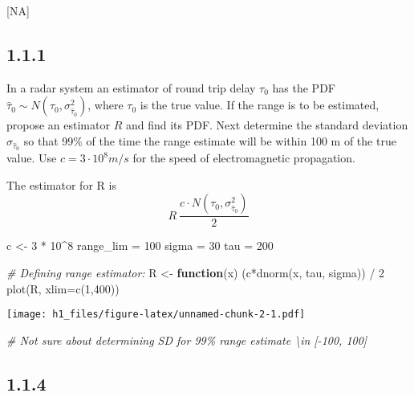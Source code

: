 \documentclass[
]{article}
\newenvironment{Shaded}{\begin{snugshade}}{\end{snugshade}}
\newcommand{\AttributeTok}[1]{\textcolor[rgb]{0.77,0.63,0.00}{#1}}
\newcommand{\CommentTok}[1]{\textcolor[rgb]{0.56,0.35,0.01}{\textit{#1}}}
\newcommand{\ControlFlowTok}[1]{\textcolor[rgb]{0.13,0.29,0.53}{\textbf{#1}}}
\newcommand{\DecValTok}[1]{\textcolor[rgb]{0.00,0.00,0.81}{#1}}
\newcommand{\FunctionTok}[1]{\textcolor[rgb]{0.00,0.00,0.00}{#1}}
\newcommand{\NormalTok}[1]{#1}
\newcommand{\OtherTok}[1]{\textcolor[rgb]{0.56,0.35,0.01}{#1}}
\newcommand{\SpecialCharTok}[1]{\textcolor[rgb]{0.00,0.00,0.00}{#1}}
\begin{document}
{[}NA{]}

\hypertarget{section-1}{%
\subsection{1.1.1}\label{section-1}}

In a radar system an estimator of round trip delay \(\tau_0\) has the
PDF \(\hat \tau_0 \sim N(\tau_0,\sigma_{\hat\tau_0}^2)\), where
\(\tau_0\) is the true value. If the range is to be estimated, propose
an estimator \(R\) and find its PDF. Next determine the standard
deviation \(\sigma_{\hat\tau_0}\) so that 99\% of the time the range
estimate will be within 100 m of the true value. Use
\(c=3\cdot 10^8 m/s\) for the speed of electromagnetic propagation.

The estimator for R is
\[R~\dfrac{c\cdot N(\tau_0, \sigma^2_{\hat \tau_0})}{2}\]

\begin{Shaded}
\begin{Highlighting}[]
\NormalTok{c }\OtherTok{\textless{}{-}} \DecValTok{3} \SpecialCharTok{*} \DecValTok{10}\SpecialCharTok{\^{}}\DecValTok{8}
\NormalTok{range\_lim }\OtherTok{=} \DecValTok{100}
\NormalTok{sigma }\OtherTok{=} \DecValTok{30}
\NormalTok{tau }\OtherTok{=} \DecValTok{200}

\CommentTok{\# Defining range estimator:}
\NormalTok{R }\OtherTok{\textless{}{-}} \ControlFlowTok{function}\NormalTok{(x) (c}\SpecialCharTok{*}\FunctionTok{dnorm}\NormalTok{(x, tau, sigma)) }\SpecialCharTok{/} \DecValTok{2}
\FunctionTok{plot}\NormalTok{(R, }\AttributeTok{xlim=}\FunctionTok{c}\NormalTok{(}\DecValTok{1}\NormalTok{,}\DecValTok{400}\NormalTok{))}
\end{Highlighting}
\end{Shaded}

\texttt{[image: h1\_files/figure-latex/unnamed-chunk-2-1.pdf]}

\begin{Shaded}
\begin{Highlighting}[]
\CommentTok{\# Not sure about determining SD for 99\% range estimate \textbackslash{}in [{-}100, 100]}
\end{Highlighting}
\end{Shaded}

\hypertarget{section-2}{%
\subsection{1.1.4}\label{section-2}}
\end{document}
